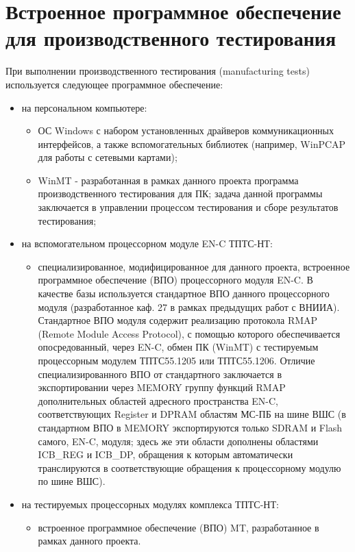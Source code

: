 \documentclass[a4paper,14pt,bachelor]{disser}
\begin{document}
\section{Встроенное программное обеспечение для производственного тестирования}
При выполнении производственного тестирования (manufacturing tests) используется следующее программное обеспечение:

\begin{itemize}
 \item на персональном компьютере:
   \begin{itemize}
      \item ОС Windows с набором установленных драйверов коммуникационных интерфейсов, а также вспомогательных библиотек (например, WinPCAP для работы с сетевыми картами);
      \item WinMT - разработанная в рамках данного проекта программа производственного тестирования для ПК; задача данной программы заключается в управлении процессом тестирования и сборе результатов тестирования;
   \end{itemize}
 \item на вспомогательном процессорном модуле EN-C ТПТС-НТ:
   \begin{itemize} 
      \item специализированное, модифицированное для данного проекта, встроенное программное обеспечение (ВПО) процессорного модуля EN-C. В качестве базы используется стандартное ВПО данного процессорного модуля (разработанное каф. 27 в рамках предыдущих работ с ВНИИА). Стандартное ВПО модуля содержит реализацию протокола RMAP (Remote Module Access Protocol), с помощью которого обеспечивается опосредованный, через EN-C, обмен ПК (WinMT) с тестируемым процессорным модулем ТПТС55.1205 или ТПТС55.1206. Отличие специализированного ВПО от стандартного заключается в экспортировании через MEMORY группу функций RMAP дополнительных областей адресного пространства EN-C, соответствующих Register и DPRAM областям МС-ПБ на шине ВШС (в стандартном ВПО в MEMORY экспортируются только SDRAM и Flash самого, EN-C, модуля; здесь же эти области дополнены областями ICB\_REG и ICB\_DP, обращения к которым автоматически транслируются в соответствующие обращения к процессорному модулю по шине ВШС).
    \end{itemize}

 \item на тестируемых процессорных модулях комплекса ТПТС-НТ:
  \begin{itemize}
     \item встроенное программное обеспечение (ВПО) MT, разработанное в рамках данного проекта.
  \end{itemize}
\end{itemize}
\end{document}
